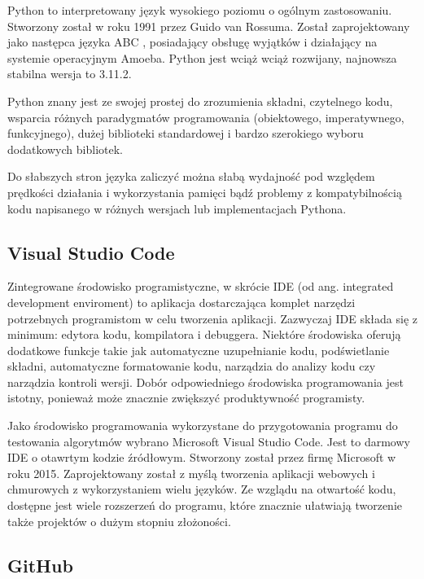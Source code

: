 \documentclass[12pt,twoside]{article}
\begin{document}
Python to interpretowany język wysokiego poziomu o ogólnym zastosowaniu.
Stworzony został w roku 1991 przez Guido van Rossuma.
Został zaprojektowany jako następca języka ABC \cite{abc}, posiadający obsługę wyjątków i działający na systemie operacyjnym Amoeba. \cite{python2}
Python jest wciąż wciąż rozwijany, najnowsza stabilna wersja to 3.11.2.

Python znany jest ze swojej prostej do zrozumienia składni,
czytelnego kodu, wsparcia różnych paradygmatów programowania (obiektowego, imperatywnego, funkcyjnego),
dużej biblioteki standardowej i bardzo szerokiego wyboru dodatkowych bibliotek. \cite{python3}

Do słabszych stron języka zaliczyć można słabą wydajność pod względem prędkości działania i wykorzystania pamięci
bądź problemy z kompatybilnością kodu napisanego w różnych wersjach lub implementacjach Pythona. \cite{python3}

\subsection{Visual Studio Code}

Zintegrowane środowisko programistyczne, w skrócie IDE (od ang. integrated development enviroment)
to aplikacja dostarczająca komplet narzędzi potrzebnych programistom w celu tworzenia aplikacji.
Zazwyczaj IDE składa się z minimum: edytora kodu, kompilatora i debuggera.
Niektóre środowiska oferują dodatkowe funkcje takie jak automatyczne uzupełnianie kodu, podświetlanie składni,
automatyczne formatowanie kodu, narządzia do analizy kodu czy narządzia kontroli wersji.
Dobór odpowiedniego środowiska programowania jest istotny, ponieważ może znacznie zwiększyć produktywność programisty. \cite{ide}

Jako środowisko programowania wykorzystane do przygotowania programu do testowania algorytmów
wybrano Microsoft Visual Studio Code. \cite{vsc}
Jest to darmowy IDE o otawrtym kodzie źródłowym. Stworzony został przez firmę Microsoft w roku 2015.
Zaprojektowany został z myślą tworzenia aplikacji webowych i chmurowych z wykorzystaniem wielu języków.
Ze wzglądu na otwartość kodu, dostępne jest wiele rozszerzeń do programu,
które znacznie ułatwiają tworzenie także projektów o dużym stopniu złożoności. \cite{vsc2}

\subsection{GitHub}
\end{document}
